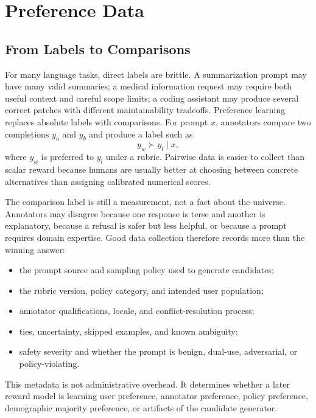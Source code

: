 \section{Preference Data}
\subsection{From Labels to Comparisons}
For many language tasks, direct labels are brittle. A summarization prompt may have many valid summaries; a medical information request may require both useful context and careful scope limits; a coding assistant may produce several correct patches with different maintainability tradeoffs. Preference learning replaces absolute labels with comparisons. For prompt $x$, annotators compare two completions $y_a$ and $y_b$ and produce a label such as
\[
    y_w \succ y_l \mid x,
\]
where $y_w$ is preferred to $y_l$ under a rubric. Pairwise data is easier to collect than scalar reward because humans are usually better at choosing between concrete alternatives than assigning calibrated numerical scores.

The comparison label is still a measurement, not a fact about the universe. Annotators may disagree because one response is terse and another is explanatory, because a refusal is safer but less helpful, or because a prompt requires domain expertise. Good data collection therefore records more than the winning answer:
\begin{itemize}
    \item the prompt source and sampling policy used to generate candidates;
    \item the rubric version, policy category, and intended user population;
    \item annotator qualifications, locale, and conflict-resolution process;
    \item ties, uncertainty, skipped examples, and known ambiguity;
    \item safety severity and whether the prompt is benign, dual-use, adversarial, or policy-violating.
\end{itemize}
This metadata is not administrative overhead. It determines whether a later reward model is learning user preference, annotator preference, policy preference, demographic majority preference, or artifacts of the candidate generator.

